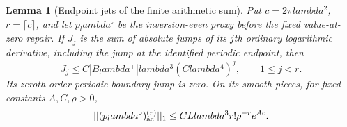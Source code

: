 \documentclass[11pt]{article}
\def\lambda{lambda}%
\def\norm#1{||#1||}%
\newtheorem{lemma}[theorem]{Lemma}
\theoremstyle{remark}
\newcommand{\norm}[1]{\left\lVert #1\right\rVert}
\begin{document}
\begin{lemma}[Endpoint jets of the finite arithmetic sum]
\label{lem:v114-endpoint-jets}
Put $c=2\pi\lambda^2$, $r=\lceil c\rceil$, and let $p_\lambda^\circ$
be the inversion-even proxy before the fixed value-at-zero repair.
If $J_j$ is the sum of absolute jumps of its $j$th ordinary logarithmic
derivative, including the jump at the identified periodic endpoint, then
\begin{equation}\label{eq:v114-jet-bound}
 J_j\le C|B_\lambda^+|\lambda^3(C\lambda^4)^j,
          \qquad 1\le j<r.
\end{equation}
Its zeroth-order periodic boundary jump is zero. On its smooth pieces,
for fixed constants $A,C,\rho>0$,
\begin{equation}\label{eq:v114-smooth-remainder}
 \norm{(p_\lambda^\circ)^{(r)}_{\rm ac}}_1
       \le CL\lambda^3 r!\rho^{-r}e^{Ac}.
\end{equation}
\end{lemma}
\end{document}
